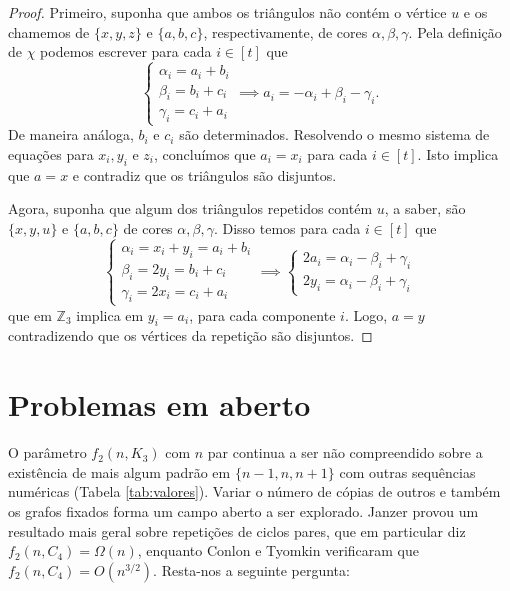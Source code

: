 \documentclass[12pt,a4paper]{book}
\def\ZZ{\mathds Z}
\def\ZZ{{\mathbb Z}}
\def\ZZ{{\mathbb Z}}
\begin{document}
\begin{proof}
        Primeiro, suponha que ambos os triângulos não contém o vértice $u$ e os chamemos de $\{x,y,z\}$ e $\{a,b,c\}$, respectivamente, de cores $\alpha, \beta, \gamma$. Pela definição de $\chi$ podemos escrever para cada $i \in [t]$ que
        \[
            \left\{\begin{matrix}
            \alpha_i = a_i +b_i\\ 
            \beta_i = b_i+c_i\\ 
            \gamma_i = c_i+a_i
            \end{matrix}\right.
            \implies a_i = -\alpha_i+\beta_i-\gamma_i.
        \]
        De maneira análoga, $b_i$ e $c_i$ são determinados. 
        Resolvendo o mesmo sistema de equações para $x_i, y_i$ e $z_i$,
        concluímos que $a_i = x_i$ para cada $i \in [t]$.
        Isto implica que $a = x$ e contradiz que os triângulos são disjuntos.
        
        Agora, suponha que algum dos triângulos repetidos contém $u$, a saber, são $\{x,y,u\}$ e $\{a,b,c\}$ de cores $\alpha, \beta, \gamma$. 
        Disso temos para cada $i \in [t]$ que
        \[
            \left\{\begin{matrix}
            \alpha_i = x_i+y_i = a_i +b_i\\ 
            \beta_i = 2y_i = b_i+c_i\\ 
            \gamma_i = 2x_i = c_i+a_i
            \end{matrix}\right.
            \implies 
            \left\{\begin{matrix}
            2a_i = \alpha_i - \beta_i + \gamma_i\\ 
            2y_i = \alpha_i - \beta_i + \gamma_i
            \end{matrix}\right.
        \]
        que em $\ZZ_3$ implica em $y_i = a_i$, para cada componente $i$. Logo, $a = y$ contradizendo que os vértices da repetição  são disjuntos.
    \end{proof}
    
    \section{Problemas em aberto}
\label{subsec:repeated-prob}

        O parâmetro $f_2(n, K_3)$ com $n$ par continua a ser não compreendido sobre a existência de mais algum padrão em $\{n-1,n,n+1\}$ com outras sequências numéricas (Tabela \ref{tab:valores}).
        Variar o número de cópias de outros e também os grafos fixados forma um campo aberto a ser explorado.
        Janzer \cite{janzer2020rainbow} provou um resultado mais geral sobre repetições de ciclos pares, que em particular diz  $f_2(n, C_4) = \Omega(n)$, enquanto Conlon e Tyomkin \cite{conlontyomkyn} verificaram que $f_2(n, C_4) = O(n^{3/2})$. Resta-nos a seguinte pergunta:
        
\end{document}
